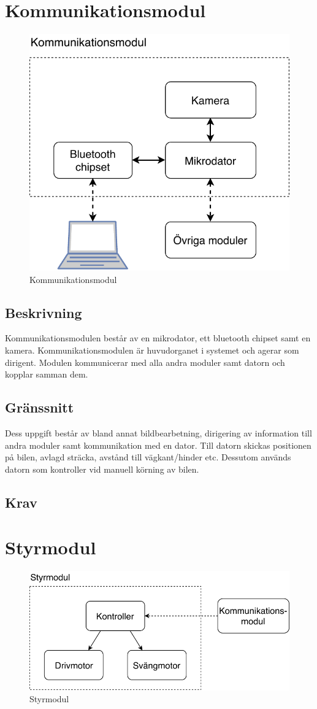 \documentclass[kravspec/krav.tex]{subfiles}
\begin{document}
\clearpage
\section{Kommunikationsmodul}
\begin{figure}[H]
    \centering
    \includegraphics[width=0.6\linewidth]{kravspec/figures/kommunikationsmodul.pdf}
    \caption{Kommunikationsmodul}
    \label{fig:kommunikationsmodul}
\end{figure}
\subsection{Beskrivning}
Kommunikationsmodulen består av en mikrodator, ett bluetooth chipset samt en
kamera. Kommunikationsmodulen är huvudorganet i systemet och agerar som
dirigent. Modulen kommunicerar med alla andra moduler samt datorn och kopplar
samman dem.
\subsection{Gränssnitt}
Dess uppgift består av bland annat bildbearbetning, dirigering av information
till andra moduler samt kommunikation med en dator. Till datorn skickas
positionen på bilen, avlagd sträcka, avstånd till vägkant/hinder etc. Dessutom
används datorn som kontroller vid manuell körning av bilen.

\subsection{Krav}
\begin{reqlist}
    \req{}
\end{reqlist}
\clearpage
\section{Styrmodul}
\begin{figure}[h]
    \centering
    \includegraphics[width=0.6\linewidth]{kravspec/figures/styrmodul.pdf}
    \caption{Styrmodul}
    \label{fig:styrmodul}
\end{figure}
\end{document}
